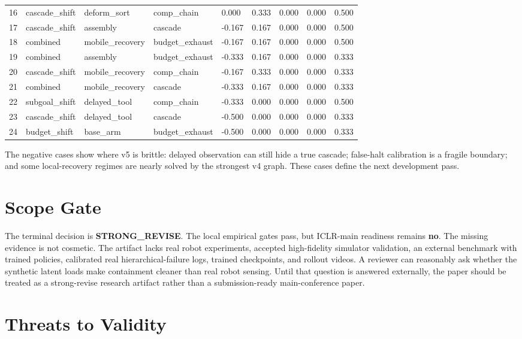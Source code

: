 \documentclass{article}
\begin{document}
\begin{longtable}{@{}rllllrrrr@{}}
16 & cascade\_shift & deform\_sort & comp\_chain & 0.000 & 0.333 & 0.000 & 0.000 & 0.500 \\
17 & cascade\_shift & assembly & cascade & -0.167 & 0.167 & 0.000 & 0.000 & 0.500 \\
18 & combined & mobile\_recovery & budget\_exhaust & -0.167 & 0.167 & 0.000 & 0.000 & 0.500 \\
19 & combined & assembly & budget\_exhaust & -0.333 & 0.167 & 0.000 & 0.000 & 0.333 \\
20 & cascade\_shift & mobile\_recovery & comp\_chain & -0.167 & 0.333 & 0.000 & 0.000 & 0.333 \\
21 & combined & mobile\_recovery & cascade & -0.333 & 0.167 & 0.000 & 0.000 & 0.333 \\
22 & subgoal\_shift & delayed\_tool & comp\_chain & -0.333 & 0.000 & 0.000 & 0.000 & 0.500 \\
23 & cascade\_shift & delayed\_tool & cascade & -0.500 & 0.000 & 0.000 & 0.000 & 0.333 \\
24 & budget\_shift & base\_arm & budget\_exhaust & -0.500 & 0.000 & 0.000 & 0.000 & 0.333 \\
\bottomrule
\end{longtable}

The negative cases show where v5 is brittle: delayed observation can still hide a true cascade; false-halt calibration is a fragile boundary; and some local-recovery regimes are nearly solved by the strongest v4 graph. These cases define the next development pass.

\section{Scope Gate}
The terminal decision is \textbf{STRONG\_REVISE}. The local empirical gates pass, but ICLR-main readiness remains \textbf{no}. The missing evidence is not cosmetic. The artifact lacks real robot experiments, accepted high-fidelity simulator validation, an external benchmark with trained policies, calibrated real hierarchical-failure logs, trained checkpoints, and rollout videos. A reviewer can reasonably ask whether the synthetic latent loads make containment cleaner than real robot sensing. Until that question is answered externally, the paper should be treated as a strong-revise research artifact rather than a submission-ready main-conference paper.

\section{Threats to Validity}
\end{document}
